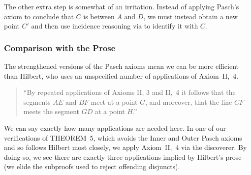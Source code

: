 The other extra step is somewhat of an irritation. Instead of applying Pasch's axiom to conclude that $C$ is between $A$ and $D$, we must instead obtain a new point $C'$ and then use incidence reasoning via  to identify it with $C$. 

\subsubsection{Comparison with the Prose}
The strengthened versions of the Pasch axioms mean we can be more efficient than Hilbert, who uses an unspecified number of applications of Axiom~II,~4.

\begin{quote}
  ``By repeated applications of Axioms II, 3 and II,~4 it follows that the segments $AE$ and $BF$ meet at a point $G$, and moreover, that the line $CF$ meets the segment $GD$ at a point $H$.''
\end{quote}

We can say exactly how many applications are needed here. In one of our verifications of THEOREM~5, which avoids the Inner and Outer Pasch axioms and so follows Hilbert most closely, we apply Axiom~II,~4 via the  discoverer. By doing so, we see there are exactly three applications implied by Hilbert's prose (we elide the subproofs used to reject offending disjuncts).

\linebreak

